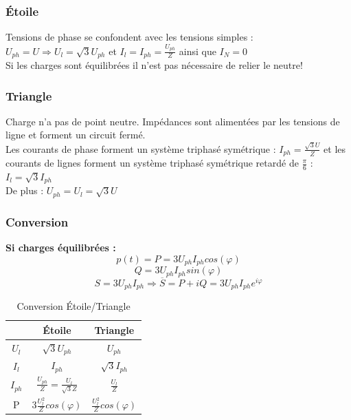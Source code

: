 \documentclass[../main.tex]{subfiles}
\begin{document}
\subsubsection{Étoile}
Tensions de phase se confondent avec les tensions simples : $U_{ph} = U \Rightarrow U_l = \sqrt{3}U_{ph}$ et $I_l = I_{ph} = \frac{U_{ph}}{Z}$ ainsi que $I_N = 0$\\
Si les charges sont équilibrées il n'est pas nécessaire de relier le neutre!

\subsubsection{Triangle}
Charge n'a pas de point neutre. Impédances sont alimentées par les tensions de ligne et forment un circuit fermé. \\
Les courants de phase forment un système triphasé symétrique : $I_{ph} = \frac{\sqrt{3}U}{Z}$ et les courants de lignes forment un système triphasé symétrique retardé de $\frac{\pi}{6}$ : $I_l = \sqrt{3}I_{ph}$\\
De plus : $U_{ph} = U_l = \sqrt{3} U$\\
\subsubsection{Conversion}
\textbf{Si charges équilibrées :}
\begin{equation}
    p(t) = P = 3U_{ph} I_{ph}cos(\varphi)
\end{equation}
\begin{equation}
    Q = 3U_{ph} I_{ph} sin(\varphi)
\end{equation}
\begin{equation}
    S = 3U_{ph} I_{ph} \Rightarrow \overline{S} = P+iQ = 3U_{ph}I_{ph} e^{i\varphi}
\end{equation}

\begin{table}[hbt!]
    \centering
    \begin{tabular}{|c|c|c|}
    \hline
    \multicolumn{1}{|c|}{\diagbox[width=7mm,height=5mm]{\diagbox[width=7mm,height=5mm,dir=SW]{}{}}{}} & Étoile & Triangle \\
    \hline
    $U_l$ & $\sqrt{3}U_{ph} $ & $U_{ph}$\\
    \hline
    $I_l$ & $I_{ph}$ & $\sqrt{3} I_{ph}$\\
    \hline
    $I_{ph}$ & $\frac{U_{ph}}{Z} = \frac{U_l}{\sqrt{3}Z}$ & $\frac{U_{l}}{Z}$ \\
    \hline
    P & $3 \frac{U_l^2}{Z} cos(\varphi)$ & $\frac{U_l^2}{Z}cos(\varphi)$\\
    \hline

    \end{tabular}
    \caption{Conversion Étoile/Triangle}
    
\end{table}
\end{document}
